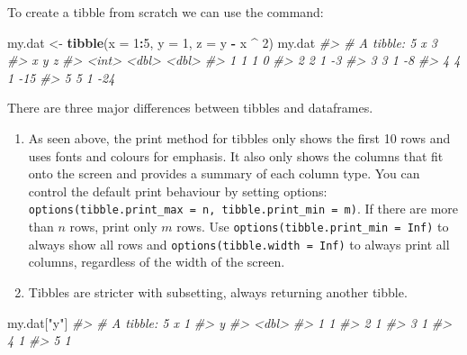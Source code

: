 \documentclass[
]{book}
\newenvironment{Shaded}{\begin{snugshade}}{\end{snugshade}}
\newcommand{\AttributeTok}[1]{\textcolor[rgb]{0.13,0.29,0.53}{#1}}
\newcommand{\CommentTok}[1]{\textcolor[rgb]{0.56,0.35,0.01}{\textit{#1}}}
\newcommand{\DecValTok}[1]{\textcolor[rgb]{0.00,0.00,0.81}{#1}}
\newcommand{\FunctionTok}[1]{\textcolor[rgb]{0.13,0.29,0.53}{\textbf{#1}}}
\newcommand{\NormalTok}[1]{#1}
\newcommand{\OtherTok}[1]{\textcolor[rgb]{0.56,0.35,0.01}{#1}}
\newcommand{\SpecialCharTok}[1]{\textcolor[rgb]{0.81,0.36,0.00}{\textbf{#1}}}
\newcommand{\StringTok}[1]{\textcolor[rgb]{0.31,0.60,0.02}{#1}}
\begin{document}
To create a tibble from scratch we can use the command:

\begin{Shaded}
\begin{Highlighting}[]
\NormalTok{my.dat }\OtherTok{\textless{}{-}} \FunctionTok{tibble}\NormalTok{(}\AttributeTok{x =} \DecValTok{1}\SpecialCharTok{:}\DecValTok{5}\NormalTok{, }\AttributeTok{y =} \DecValTok{1}\NormalTok{, }\AttributeTok{z =}\NormalTok{ y }\SpecialCharTok{{-}}\NormalTok{ x }\SpecialCharTok{\^{}} \DecValTok{2}\NormalTok{)}
\NormalTok{my.dat}
\CommentTok{\#\textgreater{} \# A tibble: 5 x 3}
\CommentTok{\#\textgreater{}       x     y     z}
\CommentTok{\#\textgreater{}   \textless{}int\textgreater{} \textless{}dbl\textgreater{} \textless{}dbl\textgreater{}}
\CommentTok{\#\textgreater{} 1     1     1     0}
\CommentTok{\#\textgreater{} 2     2     1    {-}3}
\CommentTok{\#\textgreater{} 3     3     1    {-}8}
\CommentTok{\#\textgreater{} 4     4     1   {-}15}
\CommentTok{\#\textgreater{} 5     5     1   {-}24}
\end{Highlighting}
\end{Shaded}

There are three major differences between tibbles and dataframes.

\begin{enumerate}
\def\labelenumi{(\alph{enumi})}
\item
  As seen above, the print method for tibbles only shows the first 10 rows and uses fonts and colours for emphasis. It also only shows the columns that fit onto the screen and provides a summary of each column type. You can control the default print behaviour by setting options: \texttt{options(tibble.print\_max\ =\ n,\ tibble.print\_min\ =\ m)}. If there are more than \(n\) rows, print only \(m\) rows. Use \texttt{options(tibble.print\_min\ =\ Inf)} to always show all rows and \texttt{options(tibble.width\ =\ Inf)} to always print all columns, regardless of the width of the screen.
\item
  Tibbles are stricter with subsetting, always returning another tibble.
\end{enumerate}

\begin{Shaded}
\begin{Highlighting}[]
\NormalTok{my.dat[}\StringTok{"y"}\NormalTok{]}
\CommentTok{\#\textgreater{} \# A tibble: 5 x 1}
\CommentTok{\#\textgreater{}       y}
\CommentTok{\#\textgreater{}   \textless{}dbl\textgreater{}}
\CommentTok{\#\textgreater{} 1     1}
\CommentTok{\#\textgreater{} 2     1}
\CommentTok{\#\textgreater{} 3     1}
\CommentTok{\#\textgreater{} 4     1}
\CommentTok{\#\textgreater{} 5     1}
\end{Highlighting}
\end{Shaded}
\end{document}
